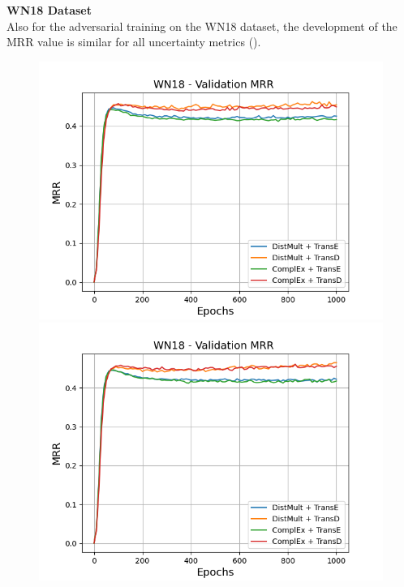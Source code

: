 \textbf{WN18 Dataset}
\label{subsubsec:measures_wn18}\\
%
Also for the adversarial training on the WN18 dataset, the development of the MRR value is similar for all uncertainty metrics ().
\begin{figure}[H]
    \centering
    \begin{minipage}{.5\textwidth}
      \centering
      \includegraphics[width=0.9\linewidth]{figures/results/gan_train/not_pretrained/uncertainty/max_distribution/entropy/wn18/1k_epochs/uncertainty_wn18_mrrs.png}
    \end{minipage}%
    \begin{minipage}{.5\textwidth}
      \centering
      \includegraphics[width=0.9\linewidth]{figures/results/gan_train/not_pretrained/uncertainty/max_distribution/least_confidence/wn18/uncertainty_wn18_mrrs.png}

\end{minipage}
\end{figure}
